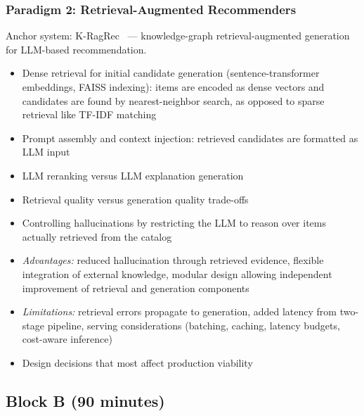 \documentclass[sigconf,nonacm]{acmart}
\begin{document}
\subsubsection{Paradigm 2: Retrieval-Augmented Recommenders}
Anchor system: K-RagRec~\cite{wang2025kragrec} --- knowledge-graph retrieval-augmented generation for LLM-based recommendation.
\begin{itemize}
    \item Dense retrieval for initial candidate generation (sentence-transformer embeddings, FAISS indexing): items are encoded as dense vectors and candidates are found by nearest-neighbor search, as opposed to sparse retrieval like TF-IDF matching
    \item Prompt assembly and context injection: retrieved candidates are formatted as LLM input
    \item LLM reranking versus LLM explanation generation
    \item Retrieval quality versus generation quality trade-offs
    \item Controlling hallucinations by restricting the LLM to reason over items actually retrieved from the catalog
    \item \textit{Advantages:} reduced hallucination through retrieved evidence, flexible integration of external knowledge, modular design allowing independent improvement of retrieval and generation components
    \item \textit{Limitations:} retrieval errors propagate to generation, added latency from two-stage pipeline, serving considerations (batching, caching, latency budgets, cost-aware inference)
    \item Design decisions that most affect production viability
\end{itemize}

\subsection{Block B (90 minutes)}
\end{document}

